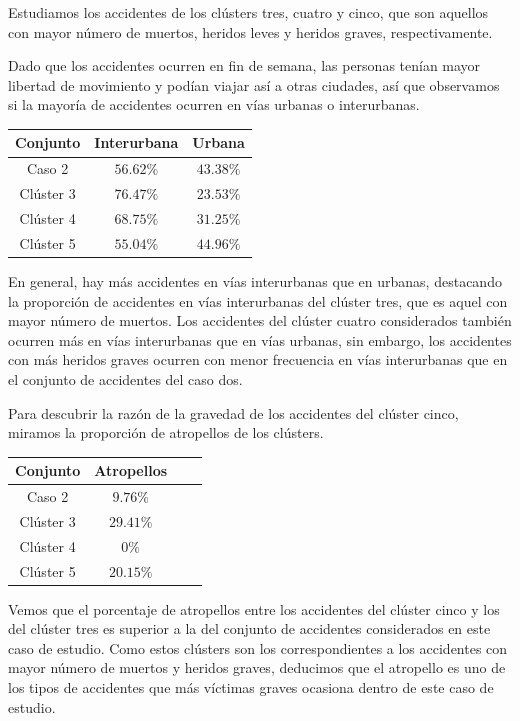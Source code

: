 \documentclass[a4]{article}
\begin{document}
Estudiamos los accidentes de los clústers tres, cuatro y cinco, que son aquellos con mayor número de muertos, heridos leves y heridos graves, respectivamente.

Dado que los accidentes ocurren en fin de semana, las personas tenían mayor libertad de movimiento y podían viajar así a otras ciudades, así que observamos si la mayoría de accidentes ocurren en vías urbanas o interurbanas.

\begin{center}
\begin{tabular}{|c|c|c|}
\hline
  \multicolumn{1}{|c|}{\textbf{Conjunto}} & \textbf{Interurbana} & \textbf{Urbana} \\ \hline
  Caso 2    & $56.62\%$ & $43.38\%$ \\ \hline
  Clúster 3 & $76.47\%$ & $23.53\%$ \\ \hline
  Clúster 4 & $68.75\%$ & $31.25\%$ \\ \hline
  Clúster 5 & $55.04\%$ & $44.96\%$ \\ \hline
\end{tabular}
\end{center}

En general, hay más accidentes en vías interurbanas que en urbanas, destacando la proporción de accidentes en vías interurbanas del clúster tres, que es aquel con mayor número de muertos. Los accidentes del clúster cuatro considerados también ocurren más en vías interurbanas que en vías urbanas, sin embargo, los accidentes con más heridos graves ocurren con menor frecuencia en vías interurbanas que en el conjunto de accidentes del caso dos.

Para descubrir la razón de la gravedad de los accidentes del clúster cinco, miramos la proporción de atropellos de los clústers.

\begin{center}
\begin{tabular}{|c|c|c|c|}
\hline
  \multicolumn{1}{|c|}{\textbf{Conjunto}} & \textbf{Atropellos}\\ \hline
  Caso 2    & $9.76\%$  \\ \hline
  Clúster 3 & $29.41\%$ \\ \hline
  Clúster 4 & $0\%$     \\ \hline
  Clúster 5 & $20.15\%$ \\ \hline
\end{tabular}
\end{center}

Vemos que el porcentaje de atropellos entre los accidentes del clúster cinco y los del clúster tres es superior a la del conjunto de accidentes considerados en este caso de estudio. Como estos clústers son los correspondientes a los accidentes con mayor número de muertos y heridos graves, deducimos que el atropello es uno de los tipos de accidentes que más víctimas graves ocasiona dentro de este caso de estudio.
\end{document}
